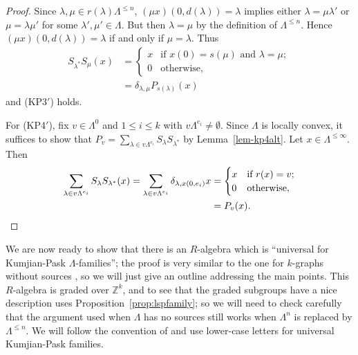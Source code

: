 \documentclass[a4paper,12pt]{amsart}
\numberwithin{equation}{section}
\theoremstyle{definition}
\theoremstyle{remark}
\begin{document}
\begin{proof}
Since $\lambda,\mu \in r(\lambda)\Lambda^{\leq n}$, 
$(\mu x)(0,d(\lambda))=\lambda$ implies
either $\lambda = \mu \lambda'$ or $\mu= \lambda \mu'$ for
some $\lambda',\mu' \in \Lambda$.  But then $\lambda = \mu$ by
the definition of $\Lambda^{\leq n}$.  Hence $(\mu x)(0,d(\lambda))=\lambda$ 
if and only if $\mu = \lambda$.
Thus 
\begin{align*}
 S_{\lambda^*}S_{\mu}(x) 
&= \begin{cases}
     x & \text{if } x(0)=s(\mu) \text{ and }
 \lambda = \mu;\\
0&\text{otherwise},
   \end{cases}
\\
&= \delta_{\lambda,\mu}P_{s(\lambda)}(x)
\end{align*}
and (KP3$'$) holds. 

For (KP4$'$),  fix  $v\in\Lambda^0$ and $1\leq i\leq k$ with
$v\Lambda^{e_i} \neq \emptyset$. Since
$\Lambda$ is locally convex, it suffices to show that
 $P_v=\sum_{\lambda \in v\Lambda^{e_i}}S_\lambda S_{\lambda^{*}}$ 
by Lemma~\ref{lem-kp4alt}.   Let $x \in \Lambda^{\leq \infty}$.
Then
\begin{align*}
 \sum_{\lambda \in v\Lambda^{e_i}}S_{\lambda} S_{\lambda^{*}} (x)
= \sum_{\lambda \in v\Lambda^{e_i}} \delta_{\lambda,x(0,e_i)}x
&= \begin{cases}
    x& \text{if } r(x) =v;\\
0&\text{otherwise},
   \end{cases}\\
&= P_v(x).\qedhere
\end{align*}
\end{proof}

 We are now ready to show that there is an $R$-algebra which is ``universal for Kumjian-Pask 
$\Lambda$-families''; the proof is very similar to the one for $k$-graphs without sources \cite[Theorem~3.4]{ACaHR}, so we will just give an outline addressing the main points. 
  This $R$-algebra is graded over ${\mathbb{Z}}^k$, and to see  that the graded subgroups  have a nice description uses Proposition~\ref{prop:lspfamily}; so we will need to check carefully that the argument used when $\Lambda$ has no sources still works when $\Lambda^n$  is replaced by $\Lambda^{\leq n}$.  We will follow the convention of \cite{ACaHR} and use lower-case letters for universal Kumjian-Pask families.
\end{document}
